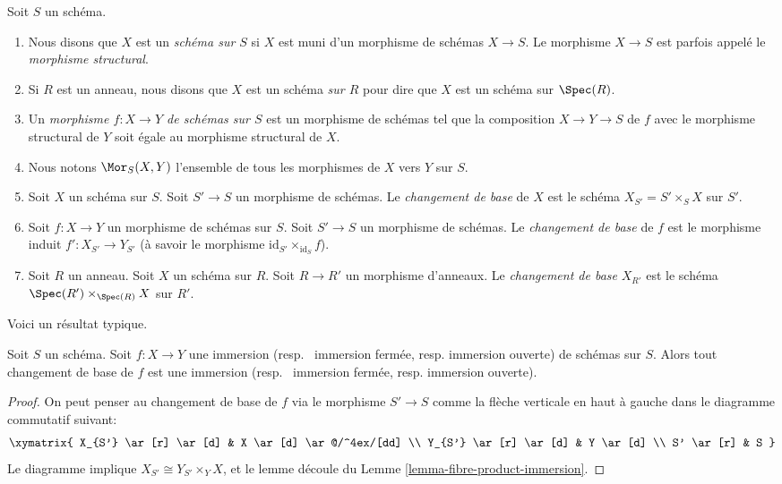 \begin{definition}
\label{definition-base-change}
Soit  $S$  un schéma.
\begin{enumerate}
\item Nous disons que  $X$  est un  {\it schéma
sur $S$} si $X$ est muni d'un morphisme
de schémas $X \to S$. Le morphisme  $X \to S$  est parfois appelé le
 {\it morphisme structural}.
\item Si  $R$  est un anneau, nous disons que  $X$  est un schéma
 {\it  sur  $R$}  pour dire que
 $X$  est un schéma sur  $\Spec(R)$.
\item Un  {\it  morphisme  $f : X \to Y$  de schémas sur
 $S$}  est un morphisme de schémas tel que la composition
 $X \to Y \to S$  de  $f$  avec le morphisme structural de  $Y$  soit
égale au morphisme structural de  $X$.
\item Nous notons  $\Mor_S(X, Y)$  l'ensemble de tous les morphismes de  $X$  vers
 $Y$  sur  $S$.
\item Soit  $X$  un schéma sur  $S$. Soit  $S' \to S$  un morphisme de
schémas. Le  {\it  changement de base}  de
 $X$  est le schéma  $X_{S'} = S' \times_S X$  sur  $S'$.
\item Soit  $f : X \to Y$  un morphisme de schémas sur  $S$. Soit  $S' \to S$  un
morphisme de schémas. Le  {\it  changement de base} 
de  $f$  est le morphisme induit  $f' : X_{S'} \to Y_{S'}$  (à savoir le morphisme
 $\text{id}_{S'} \times_{\text{id}_S} f$).
\item Soit  $R$  un anneau. Soit  $X$  un schéma sur  $R$. Soit
 $R \to R'$  un morphisme d'anneaux. Le
 {\it changement de base}   $X_{R'}$  est le schéma  $\Spec(R') \times_{\Spec(R)} X$  sur
 $R'$.
\end{enumerate}
\end{definition}

\noindent
Voici un résultat typique.

\begin{lemma}
\label{lemma-base-change-immersion}
Soit  $S$  un schéma. Soit  $f : X \to Y$  une immersion (resp. \ 
immersion fermée, resp. immersion ouverte) de schémas sur  $S$. Alors tout
changement de base de  $f$  est une immersion (resp. \  immersion
fermée, resp. immersion ouverte).
\end{lemma}

\begin{proof}
On peut penser au changement de base de  $f$  via le morphisme  $S' \to S$ 
comme la flèche verticale en haut à gauche dans le diagramme commutatif suivant:
$$
\xymatrix{
X_{S'} \ar[r] \ar[d] & X \ar[d] \ar@/^4ex/[dd] \\
Y_{S'} \ar[r] \ar[d] & Y \ar[d] \\
S' \ar[r] & S
}
$$
Le diagramme implique  $X_{S'} \cong Y_{S'} \times_Y X$, et le lemme découle du Lemme  \ref{lemma-fibre-product-immersion}.
\end{proof}

